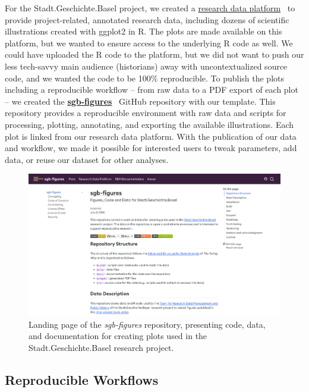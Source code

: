 \documentclass[final]{anthology-ch} %
\begin{document}
For the Stadt.Geschichte.Basel project, we created a \href{https://forschung.stadtgeschichtebasel.ch/}{research data platform}~\cite{goerlich2023} to provide project-related, annotated research data, including dozens of scientific illustrations created with ggplot2 in R. The plots are made available on this platform, but we wanted to ensure access to the underlying R code as well. We could have uploaded the R code to the platform, but we did not want to push our less tech-savvy main audience (historians) away with uncontextualized source code, and we wanted the code to be 100\% reproducible. To publish the plots including a reproducible workflow -- from raw data to a PDF export of each plot -- we created the \href{https://dokumentation.stadtgeschichtebasel.ch/sgb-figures}{\textbf{sgb-figures}}~\cite{twente2025c} GitHub repository with our template. This repository provides a reproducible environment with raw data and scripts for processing, plotting, annotating, and exporting the available illustrations. Each plot is linked from our research data platform. With the publication of our data and workflow, we made it possible for interested users to tweak parameters, add data, or reuse our dataset for other analyses.

\begin{figure}[t!]
  \centering
  \includegraphics[width=0.9\linewidth]{images/dokumentation_stadtgeschichtebasel_ch_sgb_figures.png}
  \caption{Landing page of the \emph{sgb-figures} repository, presenting code, data, and documentation for creating plots used in the Stadt.Geschichte.Basel research project.}
  \label{fig-sgb-figures}
\end{figure}

\subsection{Reproducible Workflows}\label{reproducible-workflows}
\end{document}
